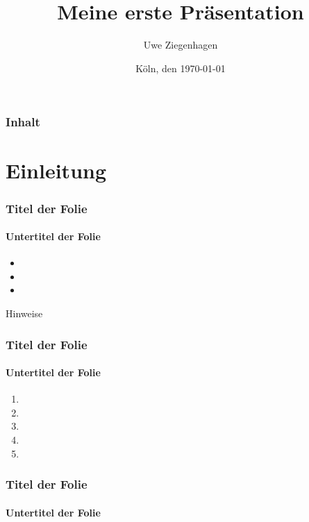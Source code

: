 \documentclass[ngerman]{beamer}
\title{Meine erste Präsentation}
\author{Uwe Ziegenhagen}
\date{Köln, den \today}
\institute{Dante e.V.}
\begin{document}
\begin{frame}

\maketitle

\end{frame}

\begin{frame}
\frametitle{Inhalt}

\tableofcontents

\end{frame}



\section{Einleitung}

\begin{frame}
\frametitle{Titel der Folie}
\framesubtitle{Untertitel der Folie}

\begin{itemize}
\item 
\item 
\item 
\end{itemize}

\begin{alert}{Hinweise}
{\scriptsize \blindtext}
\end{alert}


\end{frame}


\begin{frame}
\frametitle{Titel der Folie}
\framesubtitle{Untertitel der Folie}

\begin{enumerate}
\item 
\item 
\item 
\item 
\item 
\end{enumerate}


\end{frame}

\begin{frame}
\frametitle{Titel der Folie}
\framesubtitle{Untertitel der Folie}

\blindtext


\end{frame}
\end{document}
